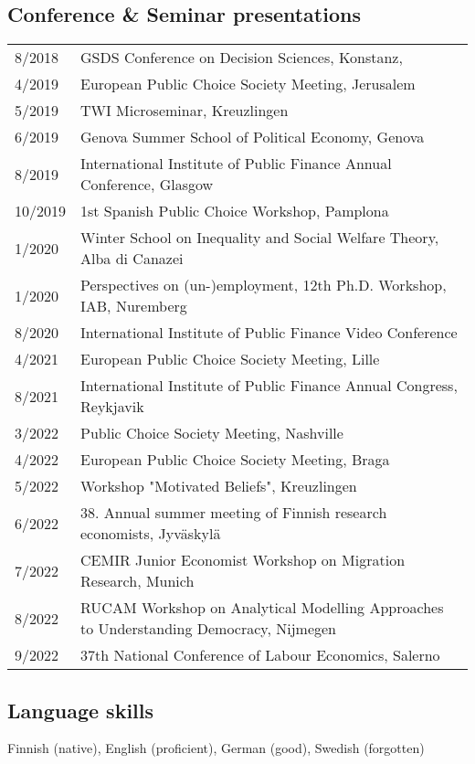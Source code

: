 \documentclass[16pt]{article}
\begin{document}
\subsection*{Conference \& Seminar presentations}
\begin{tabular}{@{}p{1.5in}p{5in}}
8/2018             & GSDS Conference on Decision Sciences, Konstanz,\\
4/2019             & European Public Choice Society Meeting, Jerusalem\\
5/2019             & TWI Microseminar, Kreuzlingen \\
6/2019             & Genova Summer School of Political Economy, Genova \\
8/2019             & International Institute of Public Finance Annual Conference, Glasgow \\
10/2019           & 1st Spanish Public Choice Workshop, Pamplona \\
1/2020             & Winter School on Inequality and Social Welfare Theory, Alba di Canazei \\
1/2020             & Perspectives on (un-)employment, 12th Ph.D. Workshop, IAB, Nuremberg \\
8/2020             & International Institute of Public Finance Video Conference \\
4/2021             & European Public Choice Society Meeting, Lille \\
8/2021             & International Institute of Public Finance Annual Congress, Reykjavik \\
3/2022             & Public Choice Society Meeting, Nashville \\
4/2022             & European Public Choice Society Meeting, Braga \\
5/2022             & Workshop "Motivated Beliefs", Kreuzlingen \\
6/2022             & 38. Annual summer meeting of Finnish research economists, Jyväskylä \\
7/2022             & CEMIR Junior Economist Workshop on Migration Research, Munich \\
8/2022             & RUCAM Workshop on Analytical Modelling Approaches to Understanding Democracy, Nijmegen \\
9/2022             &  37th National Conference of Labour Economics, Salerno
\end{tabular}

\subsection*{Language skills}
Finnish (native), English (proficient), German (good), Swedish (forgotten)
\end{document}
